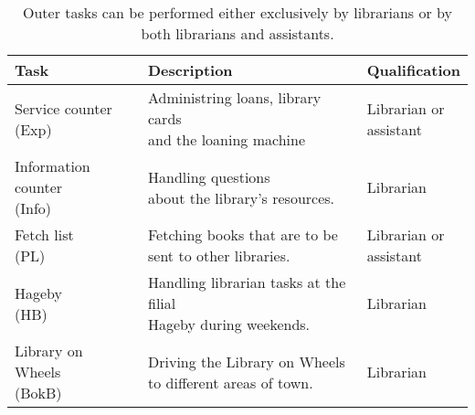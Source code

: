 \begin{table}[h]
\centering
\caption{Outer tasks can be performed either exclusively by librarians or by both librarians and assistants.}
\label{tab:Outer_Tasks}
\begin{tabularx}{\textwidth}{|l|l|X|}
\hline
\textbf{Task} & \textbf{Description} & \textbf{Qualification}\\ \hline 
\specialcell[t]{Service counter \\ (Exp)}  & \specialcell[t]{Administring loans, library cards\\ and the loaning machine} & \specialcell[t]{Librarian or \\  assistant} 
\\ \hline
\specialcell[t]{Information counter \\ (Info)} & \specialcell[t]{Handling questions \\about the library's resources.} & Librarian
\\ \hline 
\specialcell[t]{Fetch list \\(PL)} & \specialcell[t]{Fetching books that are to be \\sent to other libraries.} & \specialcell[t]{Librarian  or \\  assistant}
\\ \hline 
\specialcell[t]{Hageby \\(HB)} & \specialcell[t]{Handling librarian tasks at the filial \\ Hageby during weekends.} & Librarian
\\ \hline 
\specialcell[t]{Library on Wheels \\(BokB)} & \specialcell[t]{Driving the Library on Wheels \\ to different areas of town.} & Librarian
\\ \hline 
\end{tabularx}
\end{table} 

